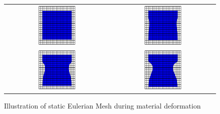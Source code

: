 \begin{figure}[htb]
\centering
\begin{tabular}{cc}
	\includegraphics[width=0.4\textwidth]{Figures/eulerian_mesh_movement_001.png}
 &  \includegraphics[width=0.4\textwidth]{Figures/eulerian_mesh_movement_002.png} 
 \\

	\includegraphics[width=0.4\textwidth]{Figures/eulerian_mesh_movement_003.png} 
 &  \includegraphics[width=0.4\textwidth]{Figures/eulerian_mesh_movement_004.png}  
 \\

\end{tabular}
\caption[bla]%
{Illustration of static Eulerian Mesh during material deformation \protect\footnotemark}
\label{fig:EulerMesh}
\end{figure}


